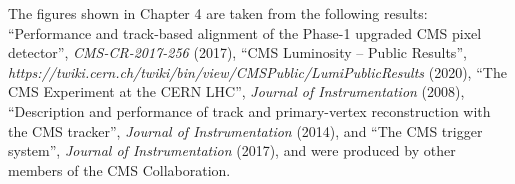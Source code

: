 The figures shown in Chapter 4 are taken from the following results: ``Performance and track-based alignment of the Phase-1 upgraded CMS pixel detector'', \emph{CMS-CR-2017-256} (2017), ``CMS Luminosity -- Public Results'', \emph{https://twiki.cern.ch/twiki/bin/view/CMSPublic/LumiPublicResults} (2020), ``The CMS Experiment at the CERN LHC'', \emph{Journal of Instrumentation} (2008), ``Description and performance of track and primary-vertex reconstruction with the CMS tracker'', \emph{Journal of Instrumentation} (2014), and ``The CMS trigger system'', \emph{Journal of Instrumentation} (2017), and were produced by other members of the CMS Collaboration.
